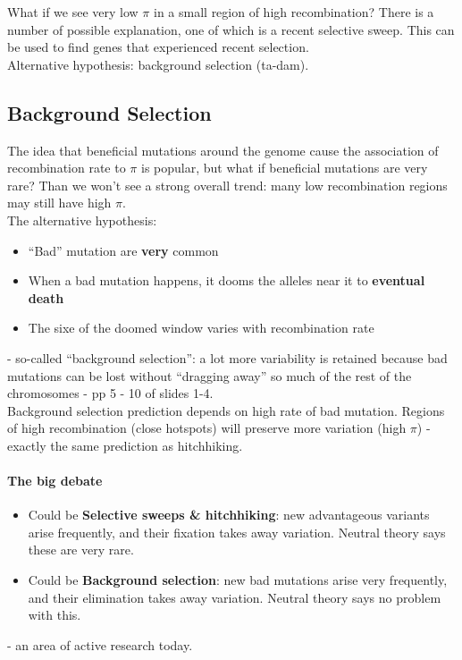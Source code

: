\documentclass{scrartcl}
\begin{document}
What if we see very low $\pi$ in a small region of high recombination?
There is a number of possible explanation, one of which is a recent selective sweep.
This can be used to find genes that experienced recent selection.\\
Alternative hypothesis: background selection (ta-dam).

\subsection{Background Selection}
\label{sec:08-04}
The idea that beneficial mutations around the genome cause the association of recombination rate to $\pi$ is popular, but what if beneficial mutations are very rare?
Than we won't see a strong overall trend: many low recombination regions may still have high $\pi$.\\
The alternative  hypothesis:
\begin{itemize}
\item ``Bad'' mutation are {\bf very} common
\item When a bad mutation happens, it dooms the alleles near it to {\bf eventual death}
\item The sixe of the doomed window varies with recombination rate
\end{itemize}
- so-called ``background selection'': a lot more variability is retained because bad mutations can be lost without ``dragging away'' so much of the rest of the chromosomes - pp 5 - 10 of slides 1-4.\\
Background selection prediction depends on high rate of bad mutation.
Regions of high recombination (close hotspots) will preserve more variation (high $\pi$) - exactly the same prediction as hitchhiking.

\paragraph{The big debate}

\begin{itemize}
\item Could be {\bf Selective sweeps \& hitchhiking}: new advantageous variants arise frequently, and their fixation takes away variation.
Neutral theory says these are very rare.
\item Could be {\bf Background selection}: new bad mutations arise very frequently, and their elimination takes away variation.
Neutral theory says no problem with this.
\end{itemize}
- an area of active research today.
\end{document}
